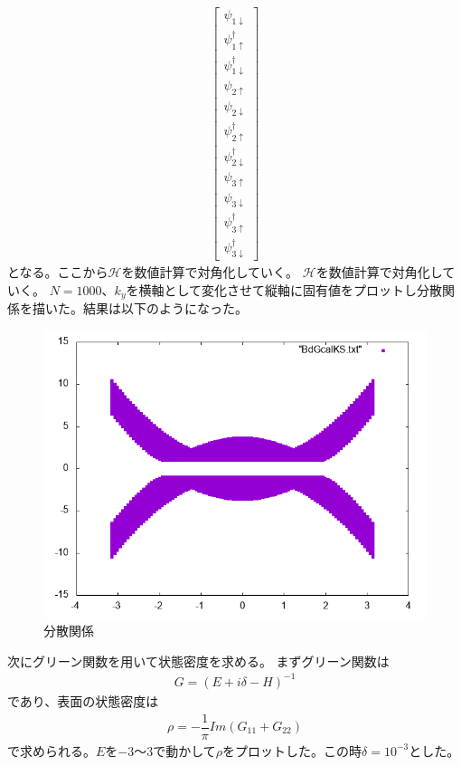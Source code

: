 \documentclass{jarticle}
\begin{document}
\begin{align}
\begin{bmatrix}
	\psi_{1\downarrow} \\ 
	\psi_{1\uparrow}^\dagger \\ 
	\psi_{1\downarrow}^\dagger \\ 
	\psi_{2\uparrow} \\ 
	\psi_{2\downarrow} \\ 
	\psi_{2\uparrow}^\dagger \\ 
	\psi_{2\downarrow}^\dagger \\ 
	\psi_{3\uparrow} \\ 
	\psi_{3\downarrow} \\ 
	\psi_{3\uparrow}^\dagger \\ 
	\psi_{3\downarrow}^\dagger
	\end{bmatrix} 
	\end{align}
	となる。ここから$\mathcal{H}$を数値計算で対角化していく。
$\mathcal{H}$を数値計算で対角化していく。
$N=1000$、$k_y$を横軸として変化させて縦軸に固有値をプロットし分散関係を描いた。結果は以下のようになった。\\
\begin{figure}[H]
	\centering
	\includegraphics[scale=0.7]{BdGcalKSs.png}
	\caption{分散関係}
\end{figure}
次にグリーン関数を用いて状態密度を求める。
まずグリーン関数は
\begin{align}
G=(E+i\delta-H)^{-1}
\end{align}
であり、表面の状態密度は
\begin{align}
\rho=-\dfrac{1}{\pi}Im(G_{11}+G_{22})
\end{align}
で求められる。$E$を$-3$〜$3$で動かして$\rho$をプロットした。この時$\delta=10^{-3}$とした。
\end{document}
